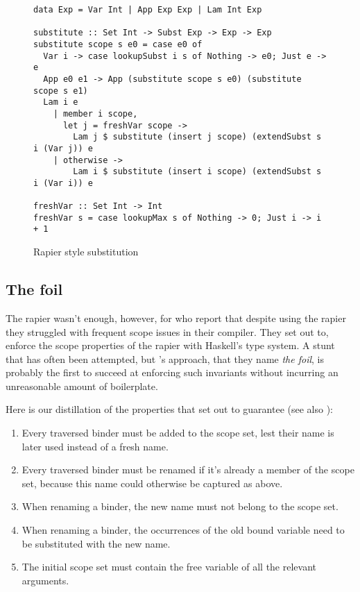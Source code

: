 \documentclass[sigconf, anonymous, review]{acmart}
\begin{document}
\begin{figure}
\begin{verbatim}
data Exp = Var Int | App Exp Exp | Lam Int Exp

substitute :: Set Int -> Subst Exp -> Exp -> Exp
substitute scope s e0 = case e0 of
  Var i -> case lookupSubst i s of Nothing -> e0; Just e -> e
  App e0 e1 -> App (substitute scope s e0) (substitute scope s e1)
  Lam i e
    | member i scope,
      let j = freshVar scope ->
        Lam j $ substitute (insert j scope) (extendSubst s i (Var j)) e
    | otherwise ->
        Lam i $ substitute (insert i scope) (extendSubst s i (Var i)) e

freshVar :: Set Int -> Int
freshVar s = case lookupMax s of Nothing -> 0; Just i -> i + 1
\end{verbatim}
\caption{Rapier style substitution}
\label{rapier-style-substitution}
\end{figure}

\subsection{The foil}
\label{the-rapier-with-stronger-types}

The rapier wasn't enough, however, for \citet{maclaurin23} who report that
despite using the rapier they struggled with frequent scope issues in their
compiler. They set out to, enforce the scope properties of the rapier with
Haskell's type system. A stunt that has often been attempted, but
\cite{maclaurin23}'s approach, that they name \emph{the foil}, is probably the
first to succeed at enforcing such invariants without incurring an unreasonable
amount of boilerplate.

Here is our distillation of the properties that \citeauthor{maclaurin23} set
out to guarantee (see also \cite[Section~4]{maclaurin23}):
\begin{enumerate}
\item Every traversed binder must be added to the scope set, lest their name
      is later used instead of a fresh name.
\item \label{req:always-rename} Every traversed binder must be renamed if it's already a member of the
      scope set, because this name could otherwise be captured as above.
\item When renaming a binder, the new name must not belong to the scope set.
\item When renaming a binder, the occurrences of the old bound variable need
      to be substituted with the new name.
\item The initial scope set must contain the free variable of all the relevant
      arguments.
\end{enumerate}
\end{document}
